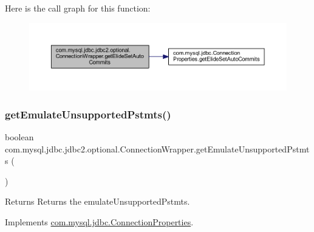 Here is the call graph for this function\+:
\nopagebreak
\begin{figure}[H]
\begin{center}
\leavevmode
\includegraphics[width=350pt]{classcom_1_1mysql_1_1jdbc_1_1jdbc2_1_1optional_1_1_connection_wrapper_a764dc2884e41a1c01956ef80e7ed578a_cgraph}
\end{center}
\end{figure}
\mbox{\label{classcom_1_1mysql_1_1jdbc_1_1jdbc2_1_1optional_1_1_connection_wrapper_a778c594d3f6f04b555615834c7287ac3}} 
\subsubsection{\texorpdfstring{get\+Emulate\+Unsupported\+Pstmts()}{getEmulateUnsupportedPstmts()}}
{\footnotesize\ttfamily boolean com.\+mysql.\+jdbc.\+jdbc2.\+optional.\+Connection\+Wrapper.\+get\+Emulate\+Unsupported\+Pstmts (\begin{DoxyParamCaption}{ }\end{DoxyParamCaption})}

\begin{DoxyReturn}{Returns}
Returns the emulate\+Unsupported\+Pstmts. 
\end{DoxyReturn}


Implements \mbox{\hyperlink{interfacecom_1_1mysql_1_1jdbc_1_1_connection_properties_ac13c3eab30955ea55dcf84333aeb730f}{com.\+mysql.\+jdbc.\+Connection\+Properties}}.

